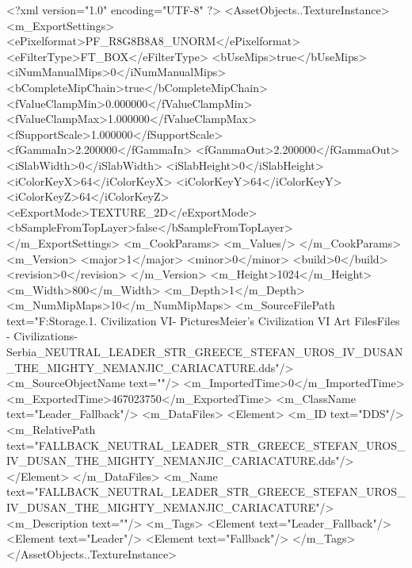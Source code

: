 <?xml version="1.0" encoding="UTF-8" ?>
<AssetObjects..TextureInstance>
	<m_ExportSettings>
		<ePixelformat>PF_R8G8B8A8_UNORM</ePixelformat>
		<eFilterType>FT_BOX</eFilterType>
		<bUseMips>true</bUseMips>
		<iNumManualMips>0</iNumManualMips>
		<bCompleteMipChain>true</bCompleteMipChain>
		<fValueClampMin>0.000000</fValueClampMin>
		<fValueClampMax>1.000000</fValueClampMax>
		<fSupportScale>1.000000</fSupportScale>
		<fGammaIn>2.200000</fGammaIn>
		<fGammaOut>2.200000</fGammaOut>
		<iSlabWidth>0</iSlabWidth>
		<iSlabHeight>0</iSlabHeight>
		<iColorKeyX>64</iColorKeyX>
		<iColorKeyY>64</iColorKeyY>
		<iColorKeyZ>64</iColorKeyZ>
		<eExportMode>TEXTURE_2D</eExportMode>
		<bSampleFromTopLayer>false</bSampleFromTopLayer>
	</m_ExportSettings>
	<m_CookParams>
		<m_Values/>
	</m_CookParams>
	<m_Version>
		<major>1</major>
		<minor>0</minor>
		<build>0</build>
		<revision>0</revision>
	</m_Version>
	<m_Height>1024</m_Height>
	<m_Width>800</m_Width>
	<m_Depth>1</m_Depth>
	<m_NumMipMaps>10</m_NumMipMaps>
	<m_SourceFilePath text="F:\Mod Storage\2.1. Civilization VI\Mods\Archive - Pictures\Sid Meier's Civilization VI Art Files\Art Files - Civilizations\Civilization - Serbia\FALLBACK_NEUTRAL_LEADER_STR_GREECE_STEFAN_UROS_IV_DUSAN_THE_MIGHTY_NEMANJIC_CARIACATURE.dds"/>
	<m_SourceObjectName text=""/>
	<m_ImportedTime>0</m_ImportedTime>
	<m_ExportedTime>467023750</m_ExportedTime>
	<m_ClassName text="Leader_Fallback"/>
	<m_DataFiles>
		<Element>
			<m_ID text="DDS"/>
			<m_RelativePath text="FALLBACK_NEUTRAL_LEADER_STR_GREECE_STEFAN_UROS_IV_DUSAN_THE_MIGHTY_NEMANJIC_CARIACATURE.dds"/>
		</Element>
	</m_DataFiles>
	<m_Name text="FALLBACK_NEUTRAL_LEADER_STR_GREECE_STEFAN_UROS_IV_DUSAN_THE_MIGHTY_NEMANJIC_CARIACATURE"/>
	<m_Description text=""/>
	<m_Tags>
		<Element text="Leader_Fallback"/>
		<Element text="Leader"/>
		<Element text="Fallback"/>
	</m_Tags>
</AssetObjects..TextureInstance>

